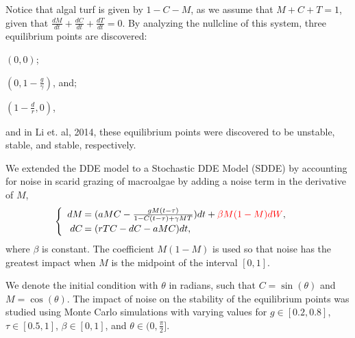Notice that algal turf is given by $1-C-M$, as we assume that $M+C+T=1$, given that $\frac{dM}{dt}+\frac{dC}{dt}+\frac{dT}{dt}=0$. By analyzing the nullcline of this system, three equilibrium points are discovered:\begin{inparaenum}[(A)]
\setcounter{enumi}{13}
\item $(0,0)$;\setcounter{enumi}{1}
\item $(0,1-\frac{g}{\gamma})$, and;\setcounter{enumi}{3}
\item $(1-\frac{d}{r},0)$,
\end{inparaenum} and in Li et. al, 2014, these equilibrium points were discovered to be unstable, stable, and stable, respectively.

We extended the DDE model to a Stochastic DDE Model (SDDE) by accounting for noise in scarid grazing of macroalgae by adding a noise term in the derivative of $M$, 
$$\begin{cases}
\begin{array}{rl}
dM\hspace{-.8em}&=(aMC - \frac{gM(t-\tau)}{1-C(t-\tau)+\gamma M T})dt+{\color{red}\beta M(1-M)dW},\\
dC\hspace{-.8em}&=(rTC  - dC - aMC)dt,\\
\end{array}
\end{cases}$$ where $\beta$ is constant. The coefficient $M(1-M)$ is used so that noise has the greatest impact when $M$ is the midpoint of the interval $[0,1]$.

We denote the initial condition with $\theta$ in radians, such that $C=\sin(\theta)$ and $M=\cos(\theta)$. The impact of noise on the stability of the equilibrium points was studied using Monte Carlo simulations with varying values for $g\in[0.2,0.8]$, $\tau\in[0.5,1]$, $\beta\in[0,1]$, and $\theta\in(0,\frac{\pi}{2}]$.